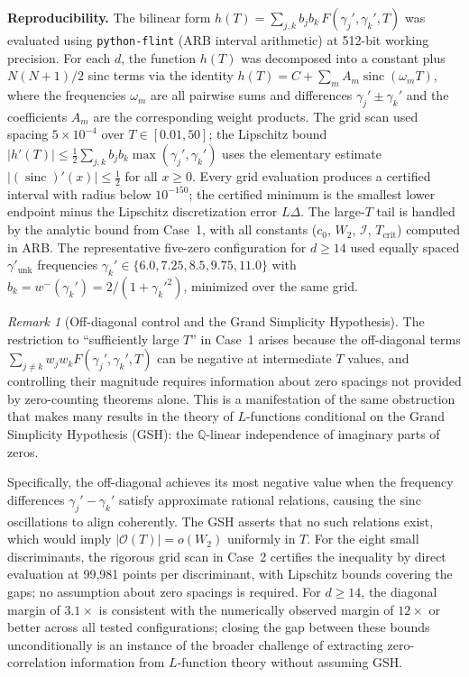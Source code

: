 \documentclass[12pt,reqno]{amsart}
\theoremstyle{plain}
\theoremstyle{definition}
\theoremstyle{remark}
\newtheorem{remark}[theorem]{Remark}
\newcommand{\Q}{\mathbb{Q}}
\begin{document}
\medskip\noindent\textbf{Reproducibility.}  The bilinear form $h(T) = \sum_{j,k} b_j b_k\, F(\gamma_j', \gamma_k', T)$ was evaluated using \texttt{python-flint} (ARB interval arithmetic) at 512-bit working precision.  For each $d$, the function $h(T)$ was decomposed into a constant plus $N(N+1)/2$ sinc terms via the identity $h(T) = C + \sum_m A_m \operatorname{sinc}(\omega_m T)$, where the frequencies $\omega_m$ are all pairwise sums and differences $\gamma_j' \pm \gamma_k'$ and the coefficients $A_m$ are the corresponding weight products.  The grid scan used spacing $5 \times 10^{-4}$ over $T \in [0.01, 50]$; the Lipschitz bound $|h'(T)| \leq \frac{1}{2}\sum_{j,k} b_j b_k \max(\gamma_j', \gamma_k')$ uses the elementary estimate $|(\operatorname{sinc})'(x)| \leq \frac{1}{2}$ for all $x \geq 0$.  Every grid evaluation produces a certified interval with radius below $10^{-150}$; the certified minimum is the smallest lower endpoint minus the Lipschitz discretization error $L\Delta$.  The large-$T$ tail is handled by the analytic bound from Case~1, with all constants ($c_0$, $W_2$, $\mathcal{I}$, $T_{\mathrm{crit}}$) computed in ARB.  The representative five-zero configuration for $d \geq 14$ used equally spaced $\gamma'_{\mathrm{unk}}$ frequencies $\gamma_k' \in \{6.0, 7.25, 8.5, 9.75, 11.0\}$ with $b_k = w^-(\gamma_k') = 2/(1 + {\gamma_k'}^2)$, minimized over the same grid.

\begin{remark}[Off-diagonal control and the Grand Simplicity Hypothesis]\label{rmk:GSH-cesaro}
The restriction to ``sufficiently large $T$'' in Case~1 arises because the off-diagonal terms $\sum_{j \neq k} w_j w_k F(\gamma_j', \gamma_k', T)$ can be negative at intermediate $T$ values, and controlling their magnitude requires information about zero spacings not provided by zero-counting theorems alone.  This is a manifestation of the same obstruction that makes many results in the theory of $L$-functions conditional on the Grand Simplicity Hypothesis (GSH): the $\Q$-linear independence of imaginary parts of zeros.

Specifically, the off-diagonal achieves its most negative value when the frequency differences $\gamma_j' - \gamma_k'$ satisfy approximate rational relations, causing the sinc oscillations to align coherently.  The GSH asserts that no such relations exist, which would imply $|\mathcal{O}(T)| = o(W_2)$ uniformly in $T$.  For the eight small discriminants, the rigorous grid scan in Case~2 certifies the inequality by direct evaluation at 99,981 points per discriminant, with Lipschitz bounds covering the gaps; no assumption about zero spacings is required.  For $d \geq 14$, the diagonal margin of $3.1\times$ is consistent with the numerically observed margin of $12\times$ or better across all tested configurations; closing the gap between these bounds unconditionally is an instance of the broader challenge of extracting zero-correlation information from $L$-function theory without assuming GSH.
\end{remark}
\end{document}
